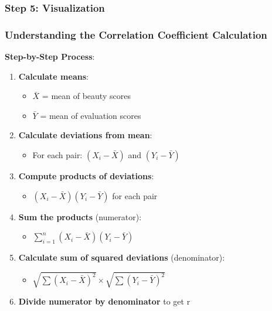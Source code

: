 \documentclass[11pt]{article}
\providecommand{\tightlist}{%
      \setlength{\itemsep}{0pt}\setlength{\parskip}{0pt}}
\begin{document}
    \subsubsection{Step 5: Visualization}\label{step-5-visualization}

    \subsubsection{Understanding the Correlation Coefficient
Calculation}\label{understanding-the-correlation-coefficient-calculation}

\textbf{Step-by-Step Process}:

\begin{enumerate}
\def\labelenumi{\arabic{enumi}.}
\tightlist
\item
  \textbf{Calculate means}:

  \begin{itemize}
  \tightlist
  \item
    \(\bar{X}\) = mean of beauty scores
  \item
    \(\bar{Y}\) = mean of evaluation scores
  \end{itemize}
\item
  \textbf{Calculate deviations from mean}:

  \begin{itemize}
  \tightlist
  \item
    For each pair: \((X_i - \bar{X})\) and \((Y_i - \bar{Y})\)
  \end{itemize}
\item
  \textbf{Compute products of deviations}:

  \begin{itemize}
  \tightlist
  \item
    \((X_i - \bar{X})(Y_i - \bar{Y})\) for each pair
  \end{itemize}
\item
  \textbf{Sum the products} (numerator):

  \begin{itemize}
  \tightlist
  \item
    \(\sum_{i=1}^{n}(X_i - \bar{X})(Y_i - \bar{Y})\)
  \end{itemize}
\item
  \textbf{Calculate sum of squared deviations} (denominator):

  \begin{itemize}
  \tightlist
  \item
    \(\sqrt{\sum(X_i - \bar{X})^2} \times \sqrt{\sum(Y_i - \bar{Y})^2}\)
  \end{itemize}
\item
  \textbf{Divide numerator by denominator} to get r
\end{enumerate}
\end{document}
